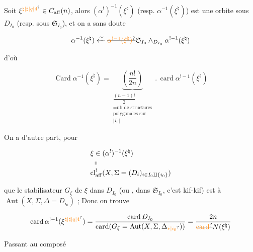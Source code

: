 

Soit $\xi^{\unsure{\natural|\sharp|q|4}}\in C_{\mathrm{aff}}(n)$, alors $(\alpha^!)^{-1}(\xi^\natural)$ (resp. $\alpha^{-1}(\xi^\natural)$) est une orbite sous $D_{I_0}$ (resp. sous $\mathfrak S_{I_0}$), et on a sans doute

\[
\alpha^{-1}(\xi^\natural)\xleftarrow{\sim}\deleted{\unsure{\alpha^{!-1}(\xi^\natural)}}\mathfrak S_{I_0}\mathbin{\wedge}_{D_{I_0}}\alpha^{!-1}(\xi^\natural)
\]

d'où

\[
\operatorname{Card}\alpha^{-1}(\xi^\natural)=
\underbrace{\left(\frac{n!}{2n}\right)}_{\substack{\dfrac{(n-1)!}{2}\\=\text{nb de structures}\\\text{polygonales sur}\\|I_0|}}
\mathbin{.}\operatorname{card}\alpha^{!-1}(\xi^\natural)
\]

On a d'autre part, pour

\[
\begin{aligned}
&\xi\in(\alpha^!)^{-1}(\xi^\natural)\\[-2pt]
&\ \shortparallel\\[-2pt]
&\mathrm{cl}^{!}_{\mathrm{aff}}(X,\Sigma=(D_i)_{i\in I_0\amalg\{i_0\}})
\end{aligned}
\]

que le stabilisateur $G_\xi$ de $\xi$ dans $D_{I_0}$ (ou , dans $\mathfrak S_{I_0}$, c'est kif-kif) est   à $\operatorname{Aut}(X,\Sigma,\Delta=D_{i_0})$ ; Donc on trouve

\[
\operatorname{card}\alpha^{!-1}(\xi^{\unsure{\natural|\sharp|q|4}})=
\frac{\operatorname{card}D_{I_0}}{\operatorname{card}(G_\xi=\operatorname{Aut}(X,\Sigma,\Delta_{\unsure{*|i_0}}))}
=\frac{2n}{\deleted{\unsure{\mathrm{card}}}N(\xi^\natural)}
\]

Passant au composé


